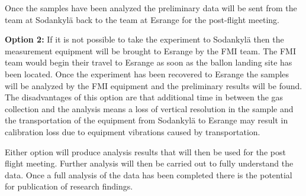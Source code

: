 Once the samples have been analyzed the preliminary data will be sent from the team at Sodankylä back to the team at Esrange for the post-flight meeting.

\textbf{Option 2:}
If it is not possible to take the experiment to Sodankylä then the measurement equipment will be brought to Esrange by the FMI team. The FMI team would begin their travel to Esrange as soon as the ballon landing site has been located. Once the experiment has been recovered to Esrange the samples will be analyzed by the FMI equipment and the preliminary results will be found. The disadvantages of this option are that additional time in between the gas collection and the analysis means a loss of vertical resolution in the sample and the transportation of the equipment from Sodankylä to Esrange may result in calibration loss due to equipment vibrations caused by transportation. 

Either option will produce analysis results that will then be used for the post flight meeting. Further analysis will then be carried out to fully understand the data. Once a full analysis of the data has been completed there is the potential for publication of research findings.


